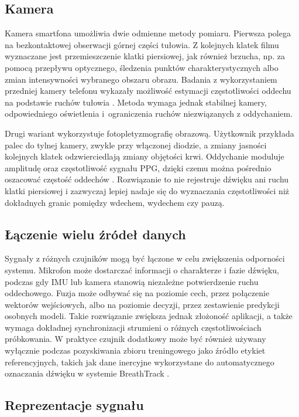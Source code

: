 \subsection{Kamera}

Kamera smartfona umożliwia dwie odmienne metody pomiaru. Pierwsza polega na bezkontaktowej obserwacji górnej części tułowia. Z kolejnych klatek filmu wyznaczane jest przemieszczenie klatki piersiowej, jak również brzucha, np. za pomocą przepływu optycznego, śledzenia punktów charakterystycznych albo zmian intensywności wybranego obszaru obrazu. Badania z wykorzystaniem przedniej kamery telefonu wykazały możliwość estymacji częstotliwości oddechu na podstawie ruchów tułowia \cite{nam2016dualCamera,bae2022smartphoneCameraRespiration}. Metoda wymaga jednak stabilnej kamery, odpowiedniego oświetlenia i~ograniczenia ruchów niezwiązanych z oddychaniem.

Drugi wariant wykorzystuje fotopletyzmografię obrazową. Użytkownik przykłada palec do tylnej kamery, zwykle przy włączonej diodzie, a zmiany jasności kolejnych klatek odzwierciedlają zmiany objętości krwi. Oddychanie moduluje amplitudę oraz częstotliwość sygnału PPG, dzięki czemu można pośrednio oszacować częstość oddechów \cite{nam2014cameraRespiration}. Rozwiązanie to nie rejestruje dźwięku ani ruchu klatki piersiowej i zazwyczaj lepiej nadaje się do wyznaczania częstotliwości niż dokładnych granic pomiędzy wdechem, wydechem czy pauzą.

\subsection{Łączenie wielu źródeł danych}

Sygnały z różnych czujników mogą być łączone w celu zwiększenia odporności systemu. Mikrofon może dostarczać informacji o charakterze i fazie dźwięku, podczas gdy IMU lub kamera stanowią niezależne potwierdzenie ruchu oddechowego. Fuzja może odbywać się na poziomie cech, przez połączenie wektorów wejściowych, albo na poziomie decyzji, przez zestawienie predykcji osobnych modeli. Takie rozwiązanie zwiększa jednak złożoność aplikacji, a także wymaga dokładnej synchronizacji strumieni o różnych częstotliwościach próbkowania. W praktyce czujnik dodatkowy może być również używany wyłącznie podczas pozyskiwania zbioru treningowego jako źródło etykiet referencyjnych, takich jak dane inercyjne wykorzystane do automatycznego oznaczania dźwięku w systemie BreathTrack \cite{10.1145/3478123}.

\subsection{Reprezentacje sygnału}

